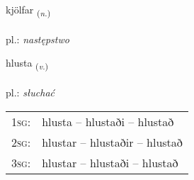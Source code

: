 \documentclass[frontgrid, backgrid]{flacards}\usepackage[]{graphicx}\usepackage[]{xcolor}
\begin{document}
\renewcommand{\flhead}{\vskip5pt \fboxsep=0pt {\small\bfseries\footnotesize Nafnorð | rzeczownik}}
\renewcommand{\fcfoot}{\vskip5pt \fboxsep=0pt \hspace{2pt}{\small\bfseries\footnotesize 1K}}

\renewcommand{\blhead}{\vskip5pt {\small\bfseries\footnotesize Nafnorð | rzeczownik }}
\renewcommand{\bcfoot}{\vskip5pt \hspace{2pt}{\small\bfseries\footnotesize 1K}}


{kjölfar \small{\textsubscript{(\textit{n.})}} \\[1ex] %
\textphonetic{[cʰœlfar]} \\
pl.: \emph{następstwo} \\  [2ex]
\renewcommand*{\arraystretch}{0.8}
}

\renewcommand{\flhead}{\vskip5pt \fboxsep=0pt {\small\bfseries\footnotesize Sagnorð | czasownik}}
\renewcommand{\fcfoot}{\vskip5pt \fboxsep=0pt \hspace{2pt}{\small\bfseries\footnotesize 1K}}

\renewcommand{\blhead}{\vskip5pt {\small\bfseries\footnotesize Sagnorð | czasownik }}
\renewcommand{\bcfoot}{\vskip5pt \hspace{2pt}{\small\bfseries\footnotesize 1K}}


{hlusta \small{\textsubscript{(\textit{v.})}} \\[1ex] %
\textphonetic{[l̥ʏsta]} \\
pl.: \emph{słuchać} \\  [2ex]
\renewcommand*{\arraystretch}{0.8}
\begin{tabular}{p{1cm}l}
\textsc{1sg}: & hlusta -- hlustaði -- hlustað \\ 
\textsc{2sg}: & hlustar -- hlustaðir -- hlustað \\ 
\textsc{3sg}: & hlustar -- hlustaði -- hlustað \\ 
\end{tabular}
}
\end{document}
